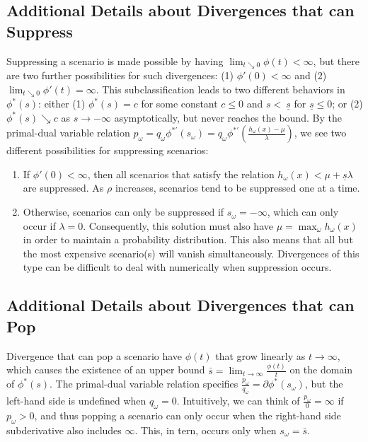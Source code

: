\documentclass[ijoc,letterpaper]{informs3} %
\begin{document}
\subsection{Additional Details about Divergences that can Suppress}
\label{ssec:suppress}

Suppressing a scenario is made possible by having $\lim_{t \searrow 0} \phi(t) < \infty$, but there are two further possibilities for such divergences: (1) $\phi'(0) < \infty$ and (2) $\lim_{t \searrow 0} \phi'(t) = \infty$.
This subclassification leads to two different behaviors in $\phi^*(s)$: either (1) $\phi^*(s) = c$ for some constant $c \leq 0$ and  $s <\ \underline{s}$ for $\underline{s} \leq 0$; or (2) $\phi^*(s) \searrow c$ as $s \rightarrow -\infty$ asymptotically, but never reaches the bound.
By the primal-dual variable relation $p_\omega = q_\omega \phi^{*\prime}(s_\omega) = q_\omega \phi^{*\prime}\left(\frac{h_\omega(x) - \mu}{\lambda}\right)$, we see two different possibilities for suppressing scenarios:
\begin{enumerate}
	\item If $\phi'(0) < \infty$, then all scenarios that satisfy the relation $h_\omega(x) < \mu + \underline{s}\lambda$ are suppressed.
		As $\rho$ increases, scenarios tend to be suppressed one at a time.
	\item Otherwise, scenarios can only be suppressed if $s_\omega = -\infty$, which can only occur if $\lambda = 0$.
		Consequently, this solution must also have $\mu = \max_\omega h_\omega(x)$ in order to maintain a probability distribution.
		This also means that all but the most expensive scenario(s) will vanish simultaneously.
		Divergences of this type can be difficult to deal with numerically when suppression occurs.
\end{enumerate}

\subsection{Additional Details about Divergences that can Pop}
\label{ssec:pop}

Divergence that can pop a scenario have $\phi(t)$ that grow linearly as $t \rightarrow \infty$, which causes the existence of an upper bound $\bar{s} = \lim_{t \rightarrow \infty} \frac{\phi(t)}{t}$ on the domain of $\phi^*(s)$.
The primal-dual variable relation specifies $\frac{p_\omega}{q_\omega} = \partial \phi^*(s_\omega)$, but the left-hand side is undefined when $q_\omega = 0$.
Intuitively, we can think of $\frac{p_\omega}{0} = \infty$ if $p_\omega > 0$, and thus popping a scenario can only occur when the right-hand side subderivative also includes $\infty$.
This, in tern, occurs only when $s_\omega = \bar{s}$.
\end{document}
